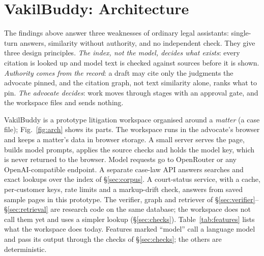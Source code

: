\section{VakilBuddy: Architecture}
\label{sec:system}
The findings above answer three weaknesses of ordinary legal assistants: single-turn answers, similarity without authority, and no independent check. They give three design principles. \emph{The index, not the model, decides what exists}: every citation is looked up and model text is checked against sources before it is shown. \emph{Authority comes from the record}: a draft may cite only the judgments the advocate pinned, and the citation graph, not text similarity alone, ranks what to pin. \emph{The advocate decides}: work moves through stages with an approval gate, and the workspace files and sends nothing.

VakilBuddy is a prototype litigation workspace organised around a \emph{matter} (a case file); Fig.~\ref{fig:arch} shows its parts. The workspace runs in the advocate's browser and keeps a matter's data in browser storage. A small server serves the page, builds model prompts, applies the source checks and holds the model key, which is never returned to the browser. Model requests go to OpenRouter \cite{openrouter} or any OpenAI-compatible endpoint. A separate case-law API answers searches and exact lookups over the index of \S\ref{sec:corpus}. A court-status service, with a cache, per-customer keys, rate limits and a markup-drift check, answers from saved sample pages in this prototype. The verifier, graph and retriever of \S\ref{sec:verifier}--\S\ref{sec:retrieval} are research code on the same database; the workspace does not call them yet and uses a simpler lookup (\S\ref{sec:checks}). Table~\ref{tab:features} lists what the workspace does today. Features marked ``model'' call a language model and pass its output through the checks of \S\ref{sec:checks}; the others are deterministic.



